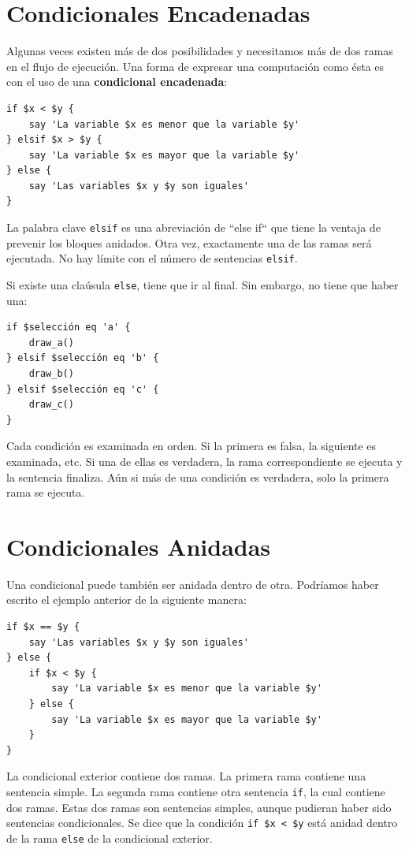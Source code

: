 \section{Condicionales Encadenadas}

Algunas veces existen más de dos posibilidades y 
necesitamos más de dos ramas en el flujo de ejecución.
Una forma de expresar una computación como ésta es con
el uso de una {\bf condicional encadenada}:

\begin{lstlisting}
if $x < $y {
    say 'La variable $x es menor que la variable $y'
} elsif $x > $y {
    say 'La variable $x es mayor que la variable $y' 
} else {
    say 'Las variables $x y $y son iguales'
}
\end{lstlisting}
%
La palabra clave {\tt elsif} es una abreviación de ``else if``
que tiene la ventaja de prevenir los bloques anidados. Otra vez,
exactamente una de las ramas será ejecutada. No hay límite 
con el número de sentencias {\tt elsif}.

Si existe una claúsula {\tt else}, tiene que ir al 
final. Sin embargo, no tiene que haber una:


\begin{lstlisting}
if $selección eq 'a' {
    draw_a()
} elsif $selección eq 'b' {
    draw_b()
} elsif $selección eq 'c' {
    draw_c()
}
\end{lstlisting}
%
Cada condición es examinada en orden. Si la primera
es falsa, la siguiente es examinada, etc. Si una de ellas
es verdadera, la rama correspondiente se ejecuta y la
sentencia finaliza. Aún si más de una condición es verdadera,
solo la primera rama se ejecuta.


\section{Condicionales Anidadas}

Una condicional puede también ser anidada dentro de otra. Podríamos
haber escrito el ejemplo anterior de la siguiente manera:

\begin{lstlisting}
if $x == $y {
    say 'Las variables $x y $y son iguales'
} else {
    if $x < $y {
        say 'La variable $x es menor que la variable $y'
    } else {
        say 'La variable $x es mayor que la variable $y'
    }
}
\end{lstlisting}
%
La condicional exterior contiene dos ramas. La primera
rama contiene una sentencia simple. La segunda rama contiene
otra sentencia {\tt if}, la cual contiene dos ramas. Estas 
dos ramas son sentencias simples, aunque pudieran haber sido
sentencias condicionales. Se dice que la condición \verb|if $x < $y| 
está anidad dentro de la rama {\tt else} de la condicional
exterior.

